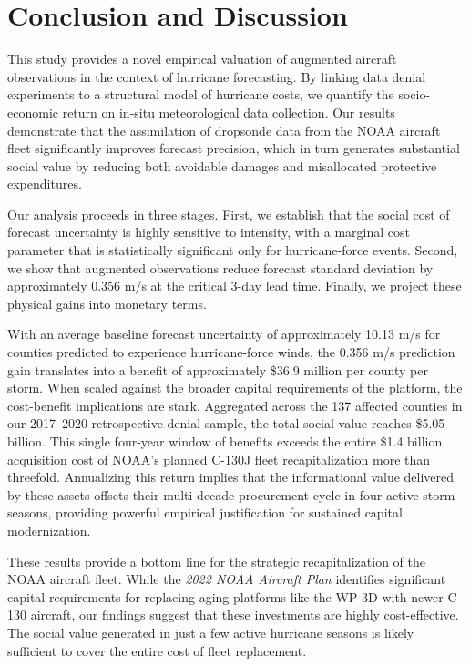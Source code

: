 \documentclass[12pt]{article}%
\begin{document}
\section{Conclusion and Discussion} \label{sec:conclusion}

This study provides a novel empirical valuation of augmented aircraft observations in the context of hurricane forecasting. By linking data denial experiments to a structural model of hurricane costs, we quantify the socio-economic return on in-situ meteorological data collection. Our results demonstrate that the assimilation of dropsonde data from the NOAA aircraft fleet significantly improves forecast precision, which in turn generates substantial social value by reducing both avoidable damages and misallocated protective expenditures.

Our analysis proceeds in three stages. First, we establish that the social cost of forecast uncertainty is highly sensitive to intensity, with a marginal cost parameter that is statistically significant only for hurricane-force events. Second, we show that augmented observations reduce forecast standard deviation by approximately 0.356 m/s at the critical 3-day lead time. Finally, we project these physical gains into monetary terms.

With an average baseline forecast uncertainty of approximately 10.13 m/s for counties predicted to experience hurricane-force winds, the 0.356 m/s prediction gain translates into a benefit of approximately \$36.9 million per county per storm. When scaled against the broader capital requirements of the platform, the cost-benefit implications are stark. Aggregated across the 137 affected counties in our 2017--2020 retrospective denial sample, the total social value reaches \$5.05 billion. This single four-year window of benefits exceeds the entire \$1.4 billion acquisition cost of NOAA's planned C-130J fleet recapitalization more than threefold. Annualizing this return implies that the informational value delivered by these assets offsets their multi-decade procurement cycle in four active storm seasons, providing powerful empirical justification for sustained capital modernization.

These results provide a bottom line for the strategic recapitalization of the NOAA aircraft fleet. While the \textit{2022 NOAA Aircraft Plan} identifies significant capital requirements for replacing aging platforms like the WP-3D with newer C-130 aircraft, our findings suggest that these investments are highly cost-effective. The social value generated in just a few active hurricane seasons is likely sufficient to cover the entire cost of fleet replacement. 
\end{document}
